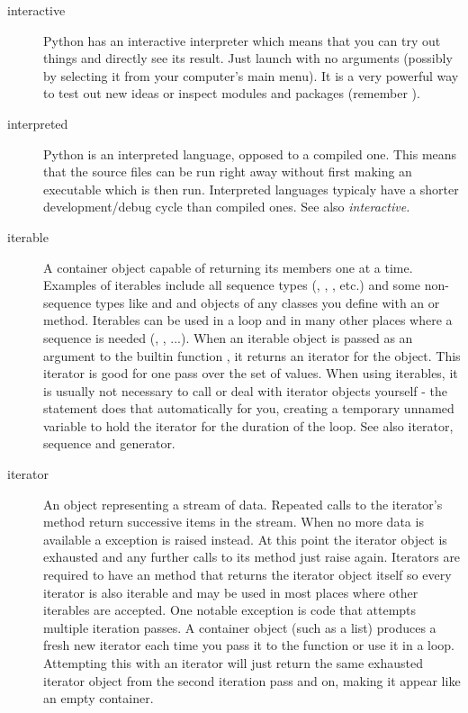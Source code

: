 \begin{description}
\item[interactive]{Python has an interactive interpreter which means that
you can try out things and directly see its result.  Just launch
{} with no arguments (possibly by selecting it from your
computer's main menu).  It is a very powerful way to test out new ideas or
inspect modules and packages (remember ).}

\item[interpreted]{Python is an interpreted language, opposed to a compiled
one.  This means that the source files can be run right away without first
making an executable which is then run.  Interpreted languages typicaly have
a shorter development/debug cycle than compiled ones.  See also
{}\em{interactive}.}

\item[iterable]{A container object capable of returning its members one at a
time.  Examples of iterables include all sequence types (,
{}, , etc.) and some non-sequence types like
{} and  and objects of any classes you define with
an  or  method.  Iterables can be
used in a  loop and in many other places where a sequence is
needed (, , ...).  When an iterable object is
passed as an argument to the builtin function , it returns
an iterator for the object.  This iterator is good for one pass over the set
of values.  When using iterables, it is usually not necessary to call
{} or deal with iterator objects yourself - the 
statement does that automatically for you, creating a temporary unnamed
variable to hold the iterator for the duration of the loop.  See also
iterator, sequence and generator.}

\item[iterator]{An object representing a stream of data.  Repeated calls to
the iterator's  method return successive items in the
stream.  When no more data is available a 
exception is raised instead.  At this point the iterator object is exhausted
and any further calls to its  method just raise
{} again.  Iterators are required to have an
{} method that returns the iterator object itself so
every iterator is also iterable and may be used in most places where other
iterables are accepted.  One notable exception is code that attempts
multiple iteration passes.  A container object (such as a list) produces a
fresh new iterator each time you pass it to the  function
or use it in a  loop.  Attempting this with an iterator will
just return the same exhausted iterator object from the second iteration
pass and on, making it appear like an empty container.}


\end{description}
